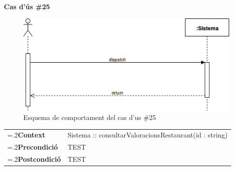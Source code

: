 \clearpage
\noindent\textbf{\large Cas d'ús \#25}\\
\begin{figure}[H]
\centering
\includegraphics[scale=0.6]{Figures/casdus_00.png}
\caption{Esquema de comportament del cas d'us \#25}
\end{figure}
\begin{table}[h]
\noindent
\begin{tabularx}{\linewidth}{
>{\hsize=.2\hsize}X%
>{\hsize=0.8\hsize}X%
}
\textbf{Context} 		& Sistema :: consultarValoracionsRestaurant(id : string) \\
\textbf{Precondició} 	& TEST \\
\textbf{Postcondició}	& TEST \\
\end{tabularx}
\label{}
\end{table}